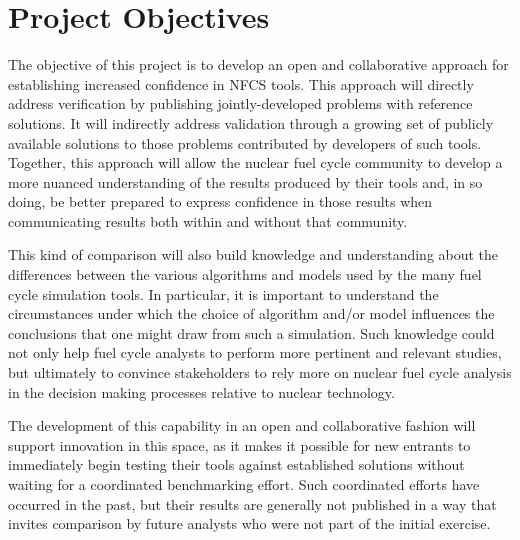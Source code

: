 \section{Project Objectives}

The objective of this project is to develop an open and collaborative approach
for establishing increased confidence in \gls{NFCS} tools. This approach will
directly address verification by publishing jointly-developed problems with
reference solutions.  It will indirectly address validation through a growing
set of publicly available solutions to those problems contributed by
developers of such tools.  Together, this approach will allow the nuclear
fuel cycle community to develop a more nuanced understanding of the results
produced by their tools and, in so doing, be better prepared to express
confidence in those results when communicating results both within and without
that community.

This kind of comparison will also build knowledge and understanding about the
differences between the various algorithms and models used by the many fuel
cycle simulation tools. In particular, it is important to understand the
circumstances under which the choice of algorithm and/or model influences the
conclusions that one might draw from such a simulation. Such knowledge could
not only help fuel cycle analysts to perform more pertinent and relevant
studies, but ultimately to convince stakeholders to rely more on nuclear fuel
cycle analysis in the decision making processes relative to nuclear
technology.

The development of this capability in an open and collaborative fashion will
support innovation in this space, as it makes it possible for new entrants to
immediately begin testing their tools against established solutions without
waiting for a coordinated benchmarking effort.  Such coordinated efforts have
occurred in the past, but their results are generally not published in a way
that invites comparison by future analysts who were not part of the initial
exercise.


